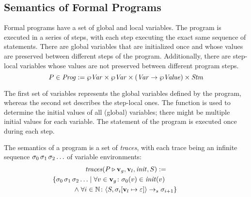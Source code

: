 \documentclass{article}
\begin{document}
\subsection{Semantics of Formal Programs}

Formal programs have a set of global and local variables. The program is executed in a series of steps, with each step executing
the exact same sequence of statements. There are global variables that are initialized once and whose values are preserved between
different steps of the program. Additionally, there are step-local variables whose values are not preserved between different
program steps.
\begin{equation*}
	P \in \mathit{Prog} := \wp \mathit{Var} \times \wp \mathit{Var} \times (\mathit{Var} \rightarrow \wp \mathit{Value}) \times \mathit{Stm}
\end{equation*}

The first set of variables represents the global variables defined by the program, whereas the second set describes the step-local
ones. The function is used to determine the initial values of all (global) variables; there might be multiple initial
values for each variable. The statement of the program is executed once during each step.

The semantics of a program is a set of \textit{traces}, with each trace being an infinite sequence $\sigma_0 \,
\sigma_1 \, \sigma_2 \ldots$ of variable environments:
\begin{multline*}
	\mathit{traces}(\prog \triangleright \toSet{\var}_g, \toSet{\var}_l, \mathit{init}, \stm) :=
	\\ \shoveright{
	\{ \varEnv_0 \, \varEnv_1 \, \varEnv_2 \ldots \mid 
		\forall \var \in \toSet{\var}_g \colon \varEnv_0(\var) \in \mathit{init}(\var) \qquad \qquad}
	\\ \wedge \;
		\forall i \in \mathbb{N} \colon \configuration{\stm, \varEnv_i[\toSet{\var}_l \mapsto \missing]} \stmArrow \varEnv_{i+1}
		\}
\end{multline*}
\end{document}
